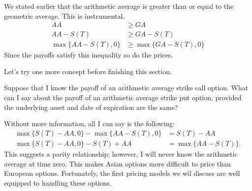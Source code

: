 \documentclass{ximera}
\begin{document}
\begin{solution}
We stated earlier that the arithmetic average is greater than or equal to the geometric average. This is instrumental.
	\begin{align*}
	AA			&\geq	GA\\
	AA-S(T)		&\geq GA-S(T)\\
	\max\{AA-S(T),0\}	&\geq \max\{GA-S(T),0\}
	\end{align*}
Since the payoffs satisfy this inequality so do the prices.
\end{solution}

Let's try one more concept before finishing this section.

\begin{example}[Parity?]
Suppose that I know the payoff of an arithmetic average strike call option. What can I say about the payoff of an arithmetic average strike put option, provided the underlying asset and date of expiration are the same?
\end{example}

\begin{solution}
Without more information, all I can say is the following:
	\begin{align*}
	\max\{S(T)-AA,0\}-\max\{AA-S(T),0\}	&=S(T)-AA\\
	\max\{S(T)-AA,0\}-S(T)+AA		&=\max\{AA-S(T)\}.
	\end{align*}
This suggests a parity relationship; however, I will never know the arithmetic average at time zero. This makes Asian options more difficult to price than European options. Fortunately, the first pricing models we wil discuss are well equipped to handling these options.
\end{solution}
\end{document}
